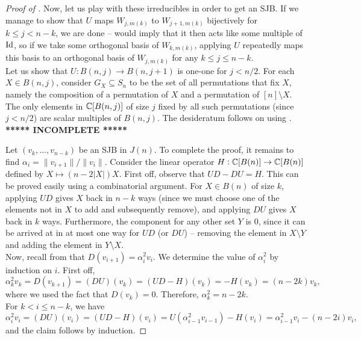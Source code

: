 	\begin{proof}[Proof of ]	
		Now, let us play with these irreducibles in order to get an SJB. If we manage to show that $U$ maps $W_{j,m(k)}$ to $W_{j+1,m(k)}$ bijectively for $k \le j < n-k$, we are done --  would imply that it then acts like some multiple of $\operatorname{Id}$, so if we take some orthogonal basis of $W_{k,m(k)}$, applying $U$ repeatedly maps this basis to an orthogonal basis of $W_{j,m(k)}$ for any $k \le j \le n-k$.\\
		Let us show that $U : B(n,j) \to B(n,j+1)$ is one-one for $j < n/2$. For each $X \in B(n,j)$, consider $G_X \subseteq S_n$ to be the set of all permutations that fix $X$, namely the composition of a permutation of $X$ and a permutation of $[n] \setminus X$. The only elements in $\mathbb{C}[B(n,j)]$ of size $j$ fixed by all such permutations (since $j < n/2$) are scalar multiples of $B(n,j)$. The desideratum follows on using .
		\textbf{***** INCOMPLETE *****}

		Let $(v_k,\ldots,v_{n-k})$ be an SJB in $J(n)$. To complete the proof, it remains to find $\alpha_i = \|v_{i+1}\|/\|v_i\|$. Consider the linear operator $H : \mathbb{C}[B(n)] \to \mathbb{C}[B(n)]$ defined by $X \mapsto (n-2|X|)X$. First off, observe that $UD-DU = H$. This can be proved easily using a combinatorial argument. For $X \in B(n)$ of size $k$, applying $UD$ gives $X$ back in $n-k$ ways (since we must choose one of the elements not in $X$ to add and subsequently remove), and applying $DU$ gives $X$ back in $k$ ways. Furthermore, the component for any other set $Y$ is $0$, since it can be arrived at in at most one way for $UD$ (or $DU$) -- removing the element in $X \setminus Y$ and adding the element in $Y \setminus X$.\\
		Now, recall from  that $D(v_{i+1}) = \alpha_i^2 v_i$. We determine the value of $\alpha_i^2$ by induction on $i$. First off,
		\[ \alpha_k^2 v_k = D(v_{k+1}) = (DU)(v_k) = (UD-H)(v_k) = -H(v_k) = (n-2k)v_k, \]
		where we used the fact that $D(v_k) = 0$. Therefore, $\alpha_k^2 = n-2k$.\\
		For $k < i \le n-k$, we have
		\[ \alpha_i^2 v_i = (DU)(v_i) = (UD-H)(v_i) = U(\alpha_{i-1}^2 v_{i-1}) - H(v_i) = \alpha_{i-1}^2 v_i - (n-2i)v_i, \]
		and the claim follows by induction.
	\end{proof}

